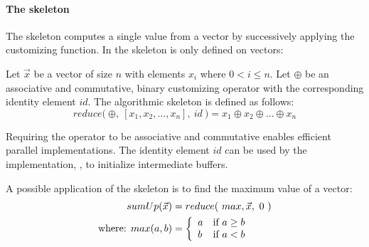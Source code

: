 \paragraph{The \reduce skeleton}
The \reduce skeleton computes a single value from a vector by successively applying the customizing function.
In \SkelCL the \reduce skeleton is only defined on vectors:
\begin{definition}
  \label{definition:reduce}
  Let $\vec{x}$ be a vector of size $n$ with elements $x_i$ where $0 < i \leq n$.
  Let $\oplus$ be an associative and commutative, binary customizing operator with the corresponding identity element $id$.
  The algorithmic skeleton \reduce is defined as follows:
  \begin{equation}
    reduce \big(\ \oplus,\ [x_1, x_2, \dots, x_n],\ id\ \big)
      = x_1 \oplus x_2 \oplus \dots \oplus x_n
  \end{equation}
\end{definition}
\noindent
Requiring the operator to be associative and commutative enables efficient parallel implementations.
The identity element $id$ can be used by the implementation, \eg, to initialize intermediate buffers. %

A possible application of the \reduce skeleton is to find the maximum value of a vector:
\begin{align*}
  sumUp(\vec{x}) &= reduce(\ max, \vec{x},\ 0\ )\\
  \text{where: } max(a, b) &=
    \left\{
      \begin{array}{l l}
      a & \text{if } a \geq b\\
      b & \text{if } a < b
      \end{array}
    \right.
\end{align*}


